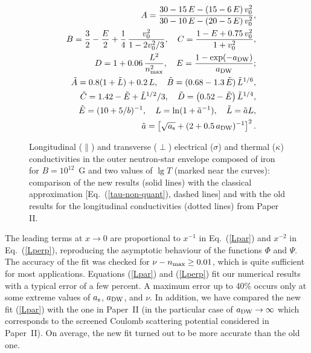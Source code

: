 \documentclass{aa}
\newcommand{\req}[1]{Eq.~(\ref{#1})}
\begin{document}
\begin{eqnarray}
&&
    A = {30-15\,E - (15-6\,E)\,v_0^2 \over
            30 - 10\,E - (20-5\,E)\,v_0^2 },
\nonumber\\&&
    B = \frac32 - {E\over2} + \frac14\, {v_0^2 \over 1-2v_0^2/3},
\quad %
    C = {1-E+0.75\,v_0^2\over 1+v_0^2},
\nonumber\\&&
    D = 1+0.06\,{L^2\over n_{\rm max}^2},
\quad %
    E = { 1-\exp(-a_{\rm DW})\over a_{\rm DW}} ;
\nonumber\\&&
    \tilde A = 0.8(1+\tilde L)+0.2\,L,
\quad %
    \tilde B = (0.68-1.3\,\tilde E)\,\tilde L^{1/6},
\nonumber\\&&
    \tilde C = 1.42-\tilde E +\tilde L^{1/2}/3,
\quad %
    \tilde D = \left(0.52 - \tilde E \right)\tilde L^{1/4},
\nonumber\\&&
    \tilde E = (10+5/b)^{-1} ,
\quad %
      L = \ln(1+\tilde a^{-1}), \quad
    \tilde L = \tilde a L,
\nonumber\\&&
    \tilde a = \left[
       \sqrt{a_{\rm s}}+(2+0.5\,a_{\rm DW})^{-1} \right]^2.
\nonumber
\end{eqnarray}

\begin{figure}
\begin{center}
 \leavevmode
\epsfysize=85mm
\end{center}
\caption[]{Longitudinal ($\|$)
and transverse ($\perp$)
electrical ($\sigma$) and thermal ($\kappa$)
conductivities in the outer neutron-star envelope
composed of iron for $B=10^{12}$~G and two values of $\lg T$
(marked near the curves):
comparison of the new results (solid lines)
with the classical approximation
[\protect\req{tau-non-quant}, dashed lines]
and with the old results for the longitudinal
conductivities (dotted lines) from Paper II.
}
\label{fig-z26b12}
\end{figure}

The leading terms at $x\to0$ are proportional to $x^{-1}$ in \req{Lpar}
and $x^{-2}$ in \req{Lperp}, reproducing the asymptotic behaviour 
of the functions $\Phi$ and $\Psi$.
The accuracy of the fit was checked for
$\nu-n_{\rm max}\geq0.01$,
which is quite sufficient for most applications.
Equations (\ref{Lpar}) and (\ref{Lperp}) fit
our numerical results with a typical error of a few
percent. A maximum error up to 40\% occurs only
at some extreme values of $a_{\rm s}$, $a_{\rm DW}$, and $\nu$.
In addition, we have compared the new fit (\ref{Lpar})
with the one in Paper~II
(in the particular case of $a_{\rm DW}\to\infty$
which corresponds to the screened Coulomb scattering potential
considered in Paper~II).
On average, the new fit turned out to be more accurate
than the old one.
\end{document}
